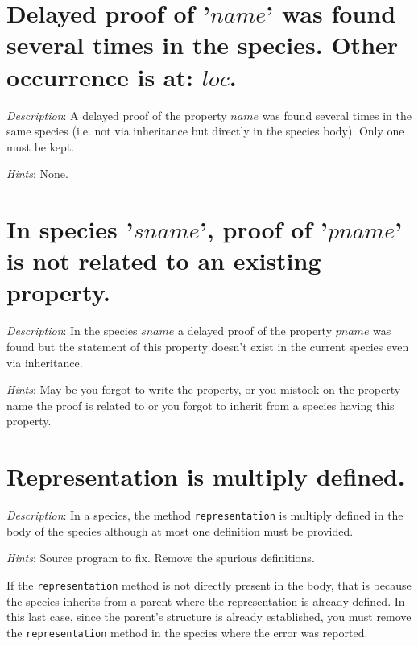 \section*{Delayed proof  of '$name$' was found several times in the
  species. Other occurrence is at: $loc$.}

{\em Description}: A delayed proof of the property $name$ was found
several times in the same species (i.e. not via inheritance but
directly in the species body). Only one must be kept.


{\em Hints}: None.



\section*{In species '$sname$', proof of '$pname$' is not related to
  an existing property.}

{\em Description}: In the species $sname$ a delayed proof of the
property $pname$ was found but the statement of this property doesn't
exist in the current species even via inheritance.


{\em Hints}: May be you forgot to write the property, or you mistook
on the property name the proof is related to or you forgot to inherit
from a species having this property.



\section*{Representation is multiply defined.}

{\em Description}: In a species, the method {\tt representation} is
multiply defined in the body of the species although at most one
definition must be provided.

{\em Hints}: Source program to fix. Remove the spurious definitions.

If the {\tt representation} method is not directly present in the
body, that is because the species inherits from a parent where the
representation is already defined. In this last case, since the parent's
structure is already established, you must remove the {\tt representation} method
in the species where the error was reported.



